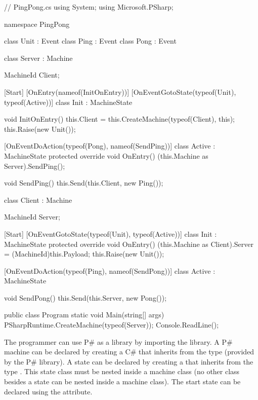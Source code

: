 \documentclass{llncs}
\newcommand{\ps}{P\#\xspace}
\newcommand{\cs}{C\#\xspace}
\begin{document}
\begin{psharp}[caption=Simple PingPong application written using \ps as a \cs library., label=fig:simple_example_cs]
// PingPong.cs
using System;
using Microsoft.PSharp;

namespace PingPong {
  class Unit : Event { }
  class Ping : Event { }
  class Pong : Event { }
  
  class Server : Machine {
    MachineId Client;
    
    [Start]
    [OnEntry(nameof(InitOnEntry))]
    [OnEventGotoState(typeof(Unit), typeof(Active))]
    class Init : MachineState { }
    
    void InitOnEntry() {
      this.Client = this.CreateMachine(typeof(Client), this);
      this.Raise(new Unit());
    }
    
    [OnEventDoAction(typeof(Pong), nameof(SendPing))]
    class Active : MachineState {
      protected override void OnEntry() {
        (this.Machine as Server).SendPing();
      }
    }
    
    void SendPing() {
      this.Send(this.Client, new Ping());
    }
  }
  
  class Client : Machine {
    MachineId Server;
    
    [Start]
    [OnEventGotoState(typeof(Unit), typeof(Active))]
    class Init : MachineState {
      protected override void OnEntry() {
        (this.Machine as Client).Server = (MachineId)this.Payload;
        this.Raise(new Unit());
      }
    }
    
    [OnEventDoAction(typeof(Ping), nameof(SendPong))]
    class Active : MachineState { }
    
    void SendPong() {
      this.Send(this.Server, new Pong());
    }
  }
  
  public class Program {
    static void Main(string[] args) {
      PSharpRuntime.CreateMachine(typeof(Server));
      Console.ReadLine();
    }
  }
}
\end{psharp}

The programmer can use \ps as a library by importing the  library. A \ps machine can be declared by creating a \cs {} that inherits from the type  (provided by the \ps library). A state can be declared by creating a  that inherits from the type . This state class must be nested inside a machine class (no other class besides a state can be nested inside a machine class). The start state can be declared using the \inlinepsharp{[Start]} attribute.
\end{document}
